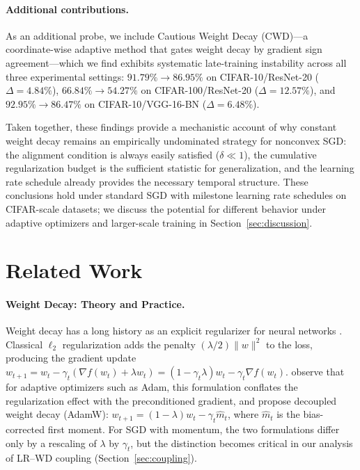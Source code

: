 \documentclass{article}
\begin{document}
\paragraph{Additional contributions.}
As an additional probe, we include Cautious Weight Decay \citep{liu2025cautious}
(CWD)---a coordinate-wise adaptive method that gates weight decay by gradient sign
agreement---which we find exhibits systematic late-training instability across all
three experimental settings:
$91.79\% \to 86.95\%$ on CIFAR-10/ResNet-20 ($\Delta = 4.84\%$),
$66.84\% \to 54.27\%$ on CIFAR-100/ResNet-20 ($\Delta = 12.57\%$), and
$92.95\% \to 86.47\%$ on CIFAR-10/VGG-16-BN ($\Delta = 6.48\%$).

Taken together, these findings provide a mechanistic account of why constant weight
decay remains an empirically undominated strategy for nonconvex SGD: the alignment
condition is always easily satisfied ($\delta \ll 1$), the cumulative regularization
budget is the sufficient statistic for generalization, and the learning rate schedule
already provides the necessary temporal structure.
These conclusions hold under standard SGD with milestone learning rate schedules on
CIFAR-scale datasets; we discuss the potential for different behavior under adaptive
optimizers and larger-scale training in Section~\ref{sec:discussion}.

\section{Related Work}
\label{sec:related}

\paragraph{Weight Decay: Theory and Practice.}
Weight decay has a long history as an explicit regularizer for neural networks
\citep{krogh1991simple}.
Classical $\ell_2$ regularization adds the penalty $(\lambda/2)\|w\|^2$ to the loss,
producing the gradient update
$w_{t+1} = w_t - \gamma_t(\nabla f(w_t) + \lambda w_t)
           = (1 - \gamma_t \lambda) w_t - \gamma_t \nabla f(w_t)$.
\citet{loshchilov2019decoupled} observe that for adaptive optimizers such as Adam,
this formulation conflates the regularization effect with the preconditioned
gradient, and propose decoupled weight decay (AdamW):
$w_{t+1} = (1 - \lambda) w_t - \gamma_t \hat{m}_t$,
where $\hat{m}_t$ is the bias-corrected first moment.
For SGD with momentum, the two formulations differ only by a rescaling of $\lambda$
by $\gamma_t$, but the distinction becomes critical in our analysis of LR--WD
coupling (Section~\ref{sec:coupling}).
\end{document}
